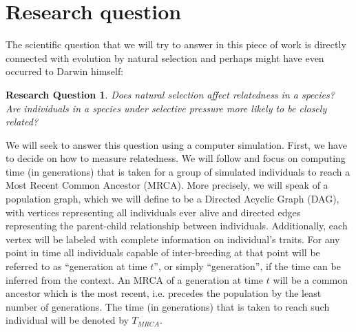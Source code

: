 \documentclass{l4proj}
\newtheorem*{quest}{Research Question}
\newif\ifdebug
\begin{document}
\ifdebug
  Next paragraph does not have to be included in the final version of the dissertation.

While the research presented in this work falls within the realm of computational biology, one should understand the difficulty of both undertaking the research in the field and presenting the results, namely, the broadness of topics and tools involved, which need to be understood and taken into account if the research is to be of any significance. A part of the struggle in communication is one of vocabulary, as each of the related fields uses specialized jargon, and researches with expertise in one field might not understand the other fields' jargon. To ease this difficulty a glossary of technical terms in use.

\fi

\section{Research question}
The scientific question that we will try to answer in this piece of work is directly connected with evolution by natural selection and perhaps might have even occurred to Darwin himself:

\begin{quest}
Does natural selection affect relatedness in a species? Are individuals in a species under selective pressure more likely to be closely related?
\end{quest}

We will seek to answer this question using a computer simulation. First, we have to decide on how to measure relatedness. We will follow \cite{rohde04} and focus on computing time (in generations) that is taken for a group of simulated individuals to reach a Most Recent Common Ancestor (MRCA). More precisely, we will speak of a \gls{population graph}, which we will define to be a Directed Acyclic Graph (DAG), with vertices representing all individuals ever alive and directed edges representing the parent-child relationship between individuals. Additionally, each vertex will be labeled with complete information on individual's traits. For any point in time all individuals capable of inter-breeding at that point will be referred to as ``generation at time $t$'', or simply ``generation'', if the time can be inferred from the context. An MRCA of a generation at time $t$ will be a common ancestor which is the most recent, i.e. precedes the population by the least number of generations. The time (in generations) that is taken to reach such individual will be denoted by $T_{MRCA}$.
\end{document}
